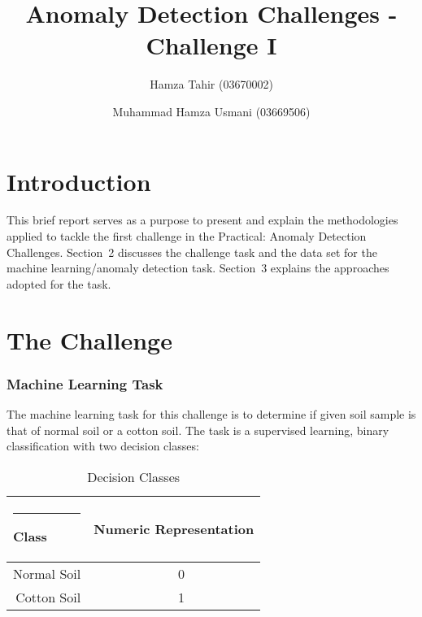 \documentclass{llncs}
\begin{document}
%
\frontmatter          %
%
\pagestyle{headings}  %

\mainmatter              %
%
\title{Anomaly Detection Challenges - Challenge I}
%

%
\author{Hamza Tahir (03670002) \and Muhammad Hamza Usmani (03669506)}
%
%

\maketitle              %


%
\section{Introduction}
%
This brief report serves as a purpose to present and explain the methodologies applied to tackle the first challenge in the Practical: Anomaly Detection Challenges. Section~2 discusses the challenge task and the data set for the machine learning/anomaly detection task. Section~3 explains the approaches adopted for the task.
%
\section{The Challenge}
%
%
\subsubsection{Machine Learning Task}
%
The machine learning task for this challenge is to determine if given soil sample is that of normal soil or a cotton soil. The task is a supervised learning, binary classification with two decision classes:
\begin{table}
\caption{Decision Classes}
\begin{center}
\begin{tabular}{r@{\quad}rl}
\hline
\multicolumn{1}{l}{\rule{2pt}{0pt}
Class}&\multicolumn{2}{l}{Numeric Representation}\\[2pt]
\hline\rule{0pt}{12pt}
Normal Soil&    0& \\
Cotton Soil&     1& \\[2pt]
\hline
\end{tabular}
\end{center}
\end{table}
%
\end{document}
